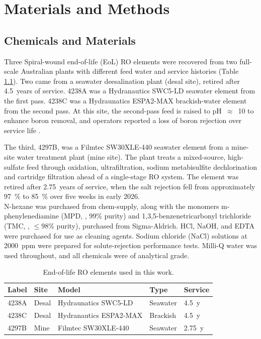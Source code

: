 \chapter{Materials and Methods}
\label{ch:methods}

\section{Chemicals and Materials}
\label{sec:materials}
Three Spiral-wound end-of-life (EoL) RO elements were recovered from two full-scale Australian plants with different feed water and service histories (Table~ \ref{tab:membranes-source}). Two came from a seawater deesalination plant (desal site), retired after \qty{4.5}{years} of service. 4238A was a Hydranautics SWC5-LD seawater element from the first pass. 4238C was a Hydraunatics ESPA2-MAX brackish-water element from the second pass. At this site, the second-pass feed is raised to pH~$\approx$~10 to enhance boron removal, and operators reported a loss of boron rejection over service life \citep{MembraneWorks2025Desal}. 

The third, 4297B, was a Filmtec SW30XLE-440 seawater element from a mine-site water treatment plant (mine site). The plant treats a mixed-source, high-sulfate feed through  oxidation, ultrafiltration, sodium metabisulfite dechlorination and cartridge filtration ahead of a single-stage RO system. The element was retired after \qty{2.75}{years} of service, when the salt rejection fell from approximately \qty{97}{\percent} to \qty{85}{\percent} over five weeks in early 2026.  \\


N-hexane was purchased from chem-supply, along with the monomers m-phenylenediamine (MPD, , 99\% purity) and 1,3,5-benzenetricarbonyl trichloride (TMC, , $\le98\%$ purity), purchased from Sigma-Aldrich. HCl, NaOH, and EDTA were purchased for use as cleaning agents. Sodium chloride (NaCl) solutions at \qty{2000}{ppm} were prepared for solute-rejection performance tests. Milli-Q water was used throughout, and all chemicals were of analytical grade.

\begin{table}[htbp]
  \centering
  \caption{End-of-life RO elements used in this work.}
  \label{tab:membranes-source}
  \begin{tabular}{|l|l|l|l|l|}
    \hline
    Label & Site  & Model                  & Type     & Service \\
    \hline
    4238A & Desal & Hydraunatics SWC5-LD & Seawater & \qty{4.5}{y} \\
    4238C & Desal & Hydranautics ESPA2-MAX & Brackish & \qty{4.5}{y} \\
    4297B & Mine  & Filmtec SW30XLE-440    & Seawater & \qty{2.75}{y}\\
    \hline
  \end{tabular}
\end{table}

